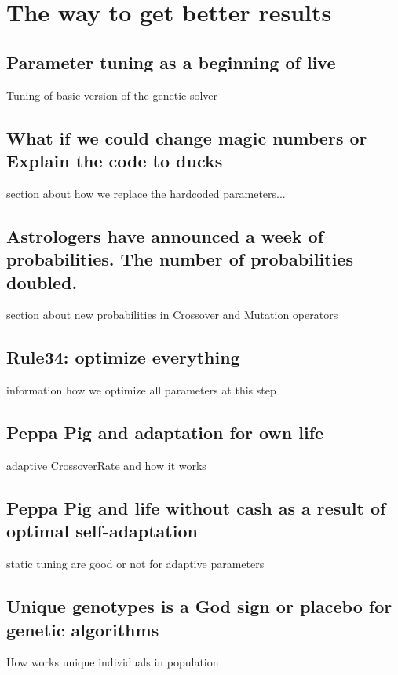 \chapter{The way to get better results}

	
\section{Parameter tuning as a beginning of live}
Tuning of basic version of the genetic solver

\section{What if we could change magic numbers or Explain the code to ducks}
section about how we replace the hardcoded parameters...

\section{Astrologers have announced a week of probabilities. The number of probabilities doubled.}
section about new probabilities in Crossover and Mutation operators

\section{Rule34: optimize everything}
information how we optimize all parameters at this step

\section{Peppa Pig and adaptation for own life}
adaptive CrossoverRate and how it works

\section{Peppa Pig and life without cash as a result of optimal self-adaptation}
static tuning are good or not for adaptive parameters

\section{Unique genotypes is a God sign or placebo for genetic algorithms}
How works unique individuals in population

